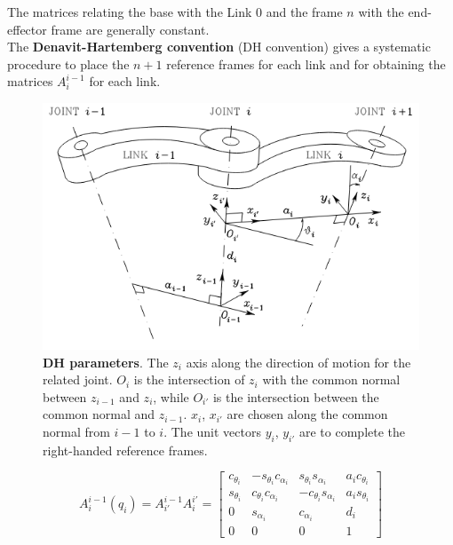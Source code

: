 The matrices relating the base with the Link 0 and the frame $n$ with the end-effector frame are generally constant.\\
The \textbf{Denavit-Hartemberg convention} (DH convention) gives a systematic procedure to place the $n+1$ reference frames for each link and for obtaining the matrices $A^{i-1}_i$ for each link.

\begin{figure}
    \centering
    \includegraphics[scale=1]{img/DH_convention.png}
    \caption{\textbf{DH parameters}. The $z_{i}$ axis along the direction of motion for the related joint. $O_{i}$ is the intersection of ${z_i}$ with the common normal between $z_{i-1}$ and $z_{i}$, while $O_{i'}$ is the intersection between the common normal and $z_{i-1}$. $x_{i}$, ${x}_{i'}$ are chosen along the common normal from $i-1$ to $i$. The unit vectors $y_{i}$, ${y}_{i'}$ are to complete the right-handed reference frames.}
    \label{fig:DHparam}
\end{figure}

\begin{equation}
    A_i^{i-1}(q_i) = A_{i'}^{i-1} A_i^{i'} =
\begin{bmatrix}
c_{\theta_i} & -s_{\theta_i} c_{\alpha_i} & s_{\theta_i} s_{\alpha_i} & a_i c_{\theta_i} \\
s_{\theta_i} & c_{\theta_i} c_{\alpha_i} & -c_{\theta_i} s_{\alpha_i} & a_i s_{\theta_i} \\
0 & s_{\alpha_i} & c_{\alpha_i} & d_i \\
0 & 0 & 0 & 1
\end{bmatrix}
\label{eq:DH_matrix}
\end{equation}

